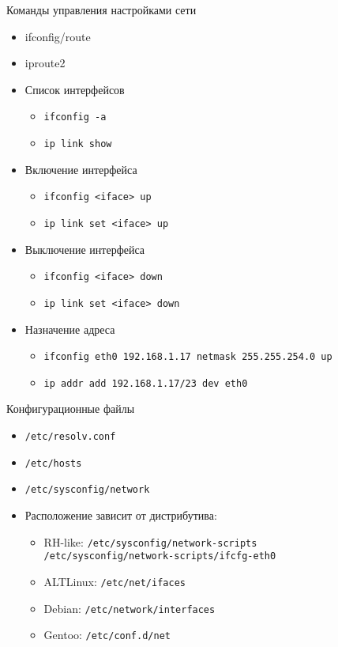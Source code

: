 \begin{frame}{Команды управления настройками сети}
	\begin{itemize}
	  \item ifconfig/route
	  \item iproute2
	\end{itemize}

	\begin{itemize}
		\item Список интерфейсов
			\begin{itemize}
				\item {\tt ifconfig -a}
				\item {\tt ip link show}
			\end{itemize}
		\item Включение интерфейса 
			\begin{itemize}
				\item {\tt ifconfig <iface> up}
				\item {\tt ip link set <iface> up}
			\end{itemize}
	  \item Выключение интерфейса
			\begin{itemize}
				\item {\tt ifconfig <iface> down}
				\item {\tt ip link set <iface> down}
			\end{itemize}
	  \item Назначение адреса
			\begin{itemize}
				\item {\tt ifconfig eth0 192.168.1.17 netmask 255.255.254.0 up}
				\item {\tt ip addr add 192.168.1.17/23 dev eth0}
			\end{itemize}
	\end{itemize}
\end{frame}

\begin{frame}{Конфигурационные файлы}
  \begin{itemize}
    \item {\tt /etc/resolv.conf}
    \item {\tt /etc/hosts}
	\item {\tt /etc/sysconfig/network}
    \item Расположение зависит от дистрибутива:
		\begin{itemize}
			\item RH-like: {\tt /etc/sysconfig/network-scripts}\\
				{\tt /etc/sysconfig/network-scripts/ifcfg-eth0}
			\item ALTLinux: {\tt /etc/net/ifaces}
			\item Debian: {\tt /etc/network/interfaces}
			\item Gentoo: {\tt /etc/conf.d/net}
		\end{itemize}
  \end{itemize}
\end{frame}
